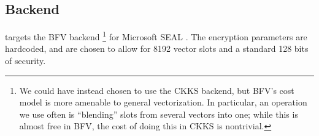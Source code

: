 
\subsection{Backend}
\system targets the BFV backend \footnote{We could have instead chosen to use the CKKS backend, but BFV's cost model is more amenable to general vectorization. In particular, an operation we use often is ``blending'' slots from several vectors into one; while this is almost free in BFV, the cost of doing this in CKKS is nontrivial. } for Microsoft SEAL .
The encryption parameters are hardcoded, and are chosen to allow for 8192 vector slots and a standard 128 bits of security.